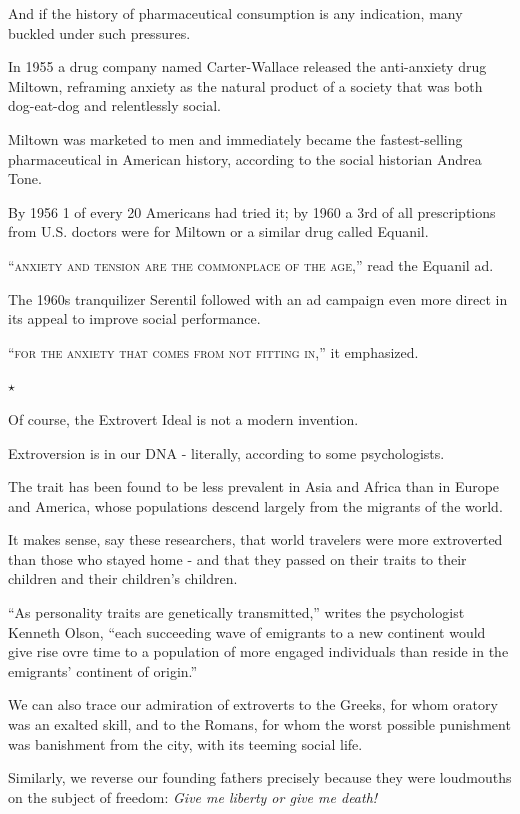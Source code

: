 \documentclass[oneside]{article}
\numberwithin{equation}{section}
\begin{document}
And if the history of pharmaceutical consumption is any indication, many buckled under such pressures.

In 1955 a drug company named Carter-Wallace released the anti-anxiety drug Miltown, reframing anxiety as the natural product of a society that was both dog-eat-dog and relentlessly social.

Miltown was marketed to men and immediately became the fastest-selling pharmaceutical in American history, according to the social historian Andrea Tone.

By 1956 1 of every 20 Americans had tried it; by 1960 a 3rd of all prescriptions from U.S. doctors were for Miltown or a similar drug called Equanil.

``\textsc{anxiety and tension are the commonplace of the age},'' read the Equanil ad.

The 1960s tranquilizer Serentil followed with an ad campaign even more direct in its appeal to improve social performance.

``\textsc{for the anxiety that comes from not fitting in},'' it emphasized.
\begin{center}
    $\star$
\end{center}
Of course, the Extrovert Ideal is not a modern invention.

Extroversion is in our DNA - literally, according to some psychologists.

The trait has been found to be less prevalent in Asia and Africa than in Europe and America, whose populations descend largely from the migrants of the world.

It makes sense, say these researchers, that world travelers were more extroverted than those who stayed home - and that they passed on their traits to their children and their children's children.

``As personality traits are genetically transmitted,'' writes the psychologist Kenneth Olson, ``each succeeding wave of emigrants to a new continent would give rise ovre time to a population of more engaged individuals than reside in the emigrants' continent of origin.''

%
We can also trace our admiration of extroverts to the Greeks, for whom oratory was an exalted skill, and to the Romans, for whom the worst possible punishment was banishment from the city, with its teeming social life.

Similarly, we reverse our founding fathers precisely because they were loudmouths on the subject of freedom: \textit{Give me liberty or give me death!}
\end{document}

